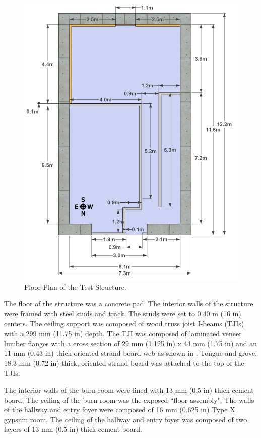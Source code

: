 \documentclass[12pt,oneside]{book}
\begin{document}
\begin{figure}[!ht]
	\includegraphics[width=6in]{../Figures/Pictures/DelCoSingleStoryDimensionsMetric}
	\caption{Floor Plan of the Test Structure.}
	\label{fig:Test_Structure_Floor_Plan}
\end{figure}
    
The floor of the structure was a concrete pad.  The interior walls of the structure were framed with steel studs and track.  The studs were set to 0.40 m (16 in) centers.  The ceiling support was composed of wood truss joist I-beams (TJIs) with a 299 mm (11.75 in) depth.  The TJI was composed of laminated veneer lumber flanges with a cross section of 29 mm (1.125 in) x 44 mm (1.75 in) and an 11 mm (0.43 in) thick oriented strand board web as shown in .  Tongue and grove, 18.3 mm (0.72 in) thick, oriented strand board was attached to the top of the TJIs.     

The interior walls of the burn room were lined with 13 mm (0.5 in) thick cement board.  The ceiling of the burn room was the exposed ``floor assembly".  The walls of the hallway and entry foyer were composed of 16 mm (0.625 in) Type X gypsum room. The ceiling of the hallway and entry foyer was composed of two layers of 13 mm (0.5 in) thick cement board.    
\end{document}
